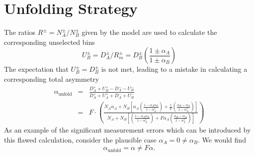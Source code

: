 \documentclass[letterpaper,11pt]{article}
\begin{document}
\section{Unfolding Strategy}
The ratios $R^{\pm}=N^{\pm}_A/N^{\pm}_B$ given by the model are used
to calculate the corresponding unselected bins
\[U^{\pm}_B = D^{\pm}_A/R^\pm_m = D^\pm_B\left(\frac{1\pm\alpha_A}{1\pm\alpha_B}\right)\]
The expectation that $U^\pm_B=D^\pm_B$ is not met, leading to a
mistake in calculating a corresponding total asymmetry
\begin{eqnarray*}
  \alpha_{\mathrm{unfold}} &=& \frac{D^+_A+U^+_B - D^-_A - U^-_B}{D^+_A+U^+_A+D^-_A+U^-_B}\\
  &=& F \cdot \left(\frac{N_A\alpha_A + N_B\left[\alpha_A\left(\frac{1-\alpha_A\alpha_B}{1-\alpha_A^2}\right) + \frac{1}{F}\left(\frac{\alpha_B-\alpha_A}{1-\alpha_A^2}\right)\right]}{N_A+N_B\left[\left(\frac{1-\alpha_A\alpha_B}{1-\alpha_A^2}\right)+F\alpha_A\left(\frac{\alpha_B-\alpha_A}{1-\alpha_A^2}\right)\right]}\right)
\end{eqnarray*}
As an example of the significant measurement errors which can be
introduced by this flawed calculation, consider the plausible case
$\alpha_A=0\ne\alpha_B$.  We would find
\[\alpha_{\mathrm{unfold}} = \alpha \ne F\alpha.\]
\end{document}
